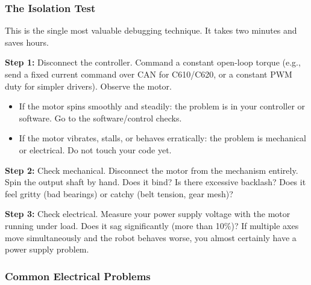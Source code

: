 \subsubsection{The Isolation Test}

This is the single most valuable debugging technique. It takes two minutes and saves hours.

\textbf{Step 1:} Disconnect the controller. Command a constant open-loop torque (e.g., send a fixed current command over CAN for C610/C620, or a constant PWM duty for simpler drivers). Observe the motor.
\begin{itemize}
    \item If the motor spins smoothly and steadily: the problem is in your controller or software. Go to the software/control checks.
    \item If the motor vibrates, stalls, or behaves erratically: the problem is mechanical or electrical. Do not touch your code yet.
\end{itemize}

\textbf{Step 2:} Check mechanical. Disconnect the motor from the mechanism entirely. Spin the output shaft by hand. Does it bind? Is there excessive backlash? Does it feel gritty (bad bearings) or catchy (belt tension, gear mesh)?

\textbf{Step 3:} Check electrical. Measure your power supply voltage with the motor running under load. Does it sag significantly (more than 10\%)? If multiple axes move simultaneously and the robot behaves worse, you almost certainly have a power supply problem.

\subsubsection{Common Electrical Problems}

